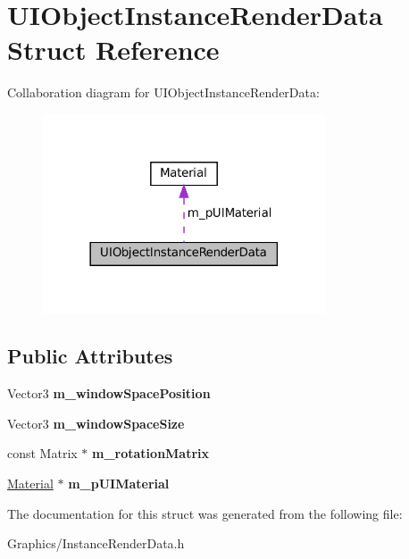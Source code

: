 \hypertarget{structUIObjectInstanceRenderData}{}\section{U\+I\+Object\+Instance\+Render\+Data Struct Reference}
\label{structUIObjectInstanceRenderData}


Collaboration diagram for U\+I\+Object\+Instance\+Render\+Data\+:\nopagebreak
\begin{figure}[H]
\begin{center}
\leavevmode
\includegraphics[width=237pt]{structUIObjectInstanceRenderData__coll__graph}
\end{center}
\end{figure}
\subsection*{Public Attributes}
\begin{DoxyCompactItemize}
\item 
\mbox{\label{structUIObjectInstanceRenderData_ad218a128ad8b2735b29a72cc454a67b4}} 
Vector3 {\bfseries m\+\_\+window\+Space\+Position}
\item 
\mbox{\label{structUIObjectInstanceRenderData_a7372465eaf8fd23c4e1bdd57eb87359f}} 
Vector3 {\bfseries m\+\_\+window\+Space\+Size}
\item 
\mbox{\label{structUIObjectInstanceRenderData_acfc5d738fd8b12a60748b3a83c79d244}} 
const Matrix $\ast$ {\bfseries m\+\_\+rotation\+Matrix}
\item 
\mbox{\label{structUIObjectInstanceRenderData_ae405b2287d1cebaa3f6a13b88aceee6a}} 
\hyperlink{classMaterial}{Material} $\ast$ {\bfseries m\+\_\+p\+U\+I\+Material}
\end{DoxyCompactItemize}


The documentation for this struct was generated from the following file\+:\begin{DoxyCompactItemize}
\item 
Graphics/Instance\+Render\+Data.\+h\end{DoxyCompactItemize}
